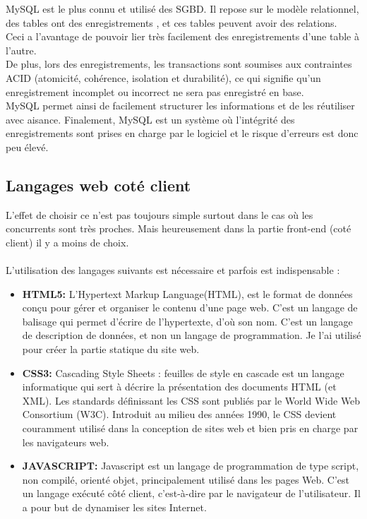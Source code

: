 \documentclass[12pt]{article}
\begin{document}
MySQL est le plus connu et utilisé des SGBD. Il repose sur le modèle relationnel, des tables ont des enregistrements , et ces tables peuvent avoir des relations.\\  Ceci a l’avantage de pouvoir lier très facilement des enregistrements d’une table à l’autre.\\  De plus, lors des enregistrements, les transactions sont soumises aux contraintes ACID (atomicité, cohérence, isolation et durabilité), ce qui signifie qu’un enregistrement incomplet ou incorrect ne sera pas enregistré en base. \\  MySQL permet ainsi de facilement structurer les informations et de les réutiliser avec aisance. Finalement, MySQL est un système où l’intégrité des enregistrements sont prises en charge par le logiciel et le risque d’erreurs est donc peu élevé.


  
   

\subsection{Langages web coté client}

L'effet de choisir ce n'est pas toujours simple surtout dans le cas où les concurrents sont très proches.
Mais heureusement dans la partie front-end (coté client) il y a moins de choix.\\ \\

L'utilisation des langages suivants est nécessaire et parfois est indispensable  :
\begin{itemize}
\item \textbf{HTML5:} L’Hypertext Markup Language(HTML), est le format de données conçu pour gérer
et organiser le contenu d'une page web. C’est un langage de balisage qui
permet d’écrire de l’hypertexte, d’où son nom. C'est un langage de description
de données, et non un langage de programmation. Je l’ai utilisé pour créer la
partie statique du site web.

\item \textbf{CSS3:} Cascading Style Sheets : feuilles de style en cascade est un langage informatique
qui sert à décrire la présentation des documents HTML (et XML). Les standards
définissant les CSS sont publiés par le World Wide Web Consortium (W3C). Introduit au
milieu des années 1990, le CSS devient couramment utilisé dans la conception de sites
web et bien pris en charge par les navigateurs web.

\item \textbf{JAVASCRIPT:} Javascript est un langage de programmation de type script, non compilé, orienté
objet, principalement utilisé dans les pages Web. C’est un langage exécuté  côté client, c'est-à-dire par le navigateur de l’utilisateur. Il a pour but de dynamiser les
sites Internet.
\end{itemize}
\end{document}
